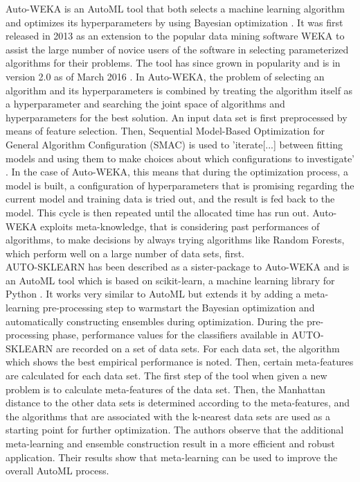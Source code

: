 \documentclass[12pt]{scrartcl}
\begin{document}
Auto-WEKA is an AutoML tool that both selects a machine learning algorithm and optimizes its hyperparameters by using Bayesian optimization \cite{thornton2013auto}. It was first released in 2013 as an extension to the popular data mining software WEKA \cite{hall2009weka} to assist the large number of novice users of the software in selecting parameterized algorithms for their problems. The tool has since grown in popularity and is in version 2.0 as of March 2016 \cite{kotthoff2016auto}. In Auto-WEKA, the problem of selecting an algorithm and its hyperparameters is combined by treating the algorithm itself as a hyperparameter and searching the joint space of algorithms and hyperparameters for the best solution. An input data set is first preprocessed by means of feature selection. Then, Sequential Model-Based Optimization for General Algorithm Configuration (SMAC) is used to 'iterate[...] between fitting models and using them to make choices about which configurations to investigate' \cite{hutter2011sequential}. In the case of Auto-WEKA, this means that during the optimization process, a model is built, a configuration of hyperparameters that is promising regarding the current model and training data is tried out, and the result is fed back to the model. This cycle is then repeated until the allocated time has run out. Auto-WEKA exploits meta-knowledge, that is considering past performances of algorithms, to make decisions by always trying algorithms like Random Forests, which perform well on a large number of data sets, first. \\

AUTO-SKLEARN has been described as a sister-package to Auto-WEKA and is an AutoML tool which is based on scikit-learn, a machine learning library for Python \cite{feurer2015efficient}. It works very similar to AutoML but extends it by adding a meta-learning pre-processing step to warmstart the Bayesian optimization and automatically constructing ensembles during optimization. During the pre-processing phase, performance values for the classifiers available in AUTO-SKLEARN are recorded on a set of data sets. For each data set, the algorithm which shows the best empirical performance is noted. Then, certain meta-features are calculated for each data set. The first step of the tool when given a new problem is to calculate meta-features of the data set. Then, the Manhattan distance to the other data sets is determined according to the meta-features, and the algorithms that are associated with the k-nearest data sets are used as a starting point for further optimization. The authors observe that the additional meta-learning and ensemble construction result in a more efficient and robust application. Their results show that meta-learning can be used to improve the overall AutoML process.\\
\end{document}
